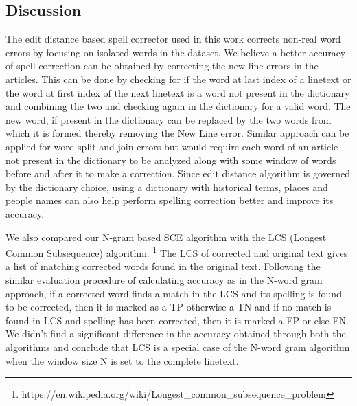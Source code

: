 \documentclass[12pt]{article}
\begin{document}
\subsection{Discussion}
The edit distance based spell corrector used in this work corrects non-real word errors by focusing on isolated words in the dataset.
We believe a better accuracy of spell correction can be obtained by correcting the new line errors in the articles. This can be done by checking for if the word at last index of a linetext or the word at first index of the next linetext is a word not present in the dictionary and combining the two and checking again in the dictionary for a valid word. The new word, if present in the dictionary can be replaced by the two words from which it is formed thereby removing the New Line error. Similar approach can be applied for word split and join errors but would require each word of an article not present in the dictionary to be analyzed along with some window of words before and after it to make a correction. 
Since edit distance algorithm is governed by the dictionary choice, using a dictionary with historical terms, places and people names can also help perform spelling correction better and improve its accuracy.

We also compared our N-gram based SCE algorithm with the LCS (Longest Common Subsequence) algorithm. \footnote{https://en.wikipedia.org/wiki/Longest\_common\_subsequence\_problem} The LCS of corrected and original text gives a list of matching corrected words found in the original text. Following the similar evaluation procedure of calculating accuracy as in the N-word gram approach, if a corrected word finds a match in the LCS and its spelling is found to be corrected, then it is marked as a TP otherwise a TN and if no match is found in LCS and spelling has been corrected, then it is marked a FP or else FN. We didn't find a significant difference in the accuracy obtained through both the algorithms and conclude that LCS is a special case of the N-word gram algorithm when the window size N is set to the complete linetext.
\end{document}
